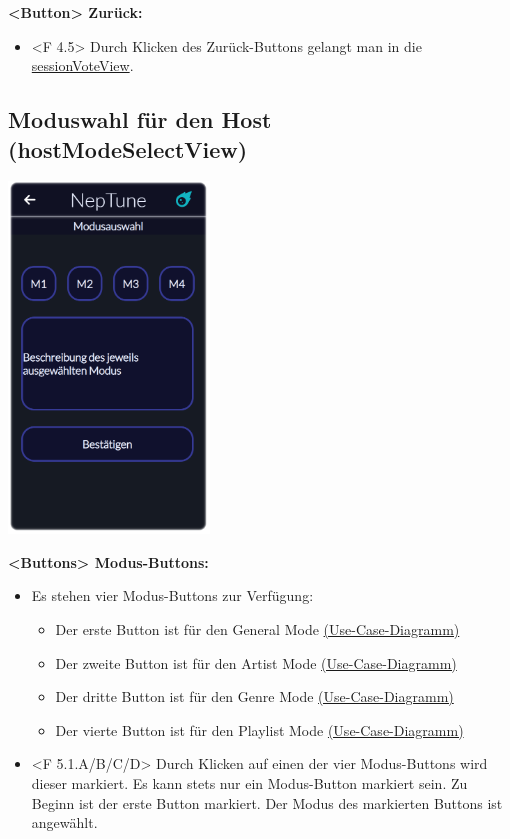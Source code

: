 \documentclass[oneside, ngerman]{sdqtechreport}
\begin{document}
\textbf{<Button> Zurück:}
\begin{itemize}
    \item <F 4.5> Durch Klicken des Zurück-Buttons gelangt man in die  \hyperlink{sessionVoteView}{sessionVoteView}.
\end{itemize}


\subsection{Moduswahl für den Host (hostModeSelectView)}
\label{sec:Benutzeroberfläche:hostModeSelectView}


\begin{center}
    \hypertarget{hostModeSelectView}{}
    \includegraphics[width=0.4\textwidth]{LATEX/Pflichtenheft/GraphicDesigns/hostModusSelectPage.png}
\end{center}

\textbf{<Buttons> Modus-Buttons:}
\begin{itemize}
    \item Es stehen vier Modus-Buttons zur Verfügung:
    \begin{itemize}
        \item Der erste Button ist für den General Mode \hyperlink{GeneralMode}{(Use-Case-Diagramm)}
        \item Der zweite Button ist für den Artist Mode \hyperlink{Artist Mode}{(Use-Case-Diagramm)}
        \item Der dritte Button ist für den Genre Mode \hyperlink{Genre Mode}{(Use-Case-Diagramm)}
        \item Der vierte Button ist für den Playlist Mode \hyperlink{Playlist Mode}{(Use-Case-Diagramm)}
    \end{itemize}
    \item <F 5.1.A/B/C/D> Durch Klicken auf einen der vier Modus-Buttons wird dieser markiert. Es kann stets nur ein Modus-Button markiert sein. Zu Beginn ist der erste Button markiert. Der Modus des markierten Buttons ist angewählt.
\end{itemize}
\end{document}
